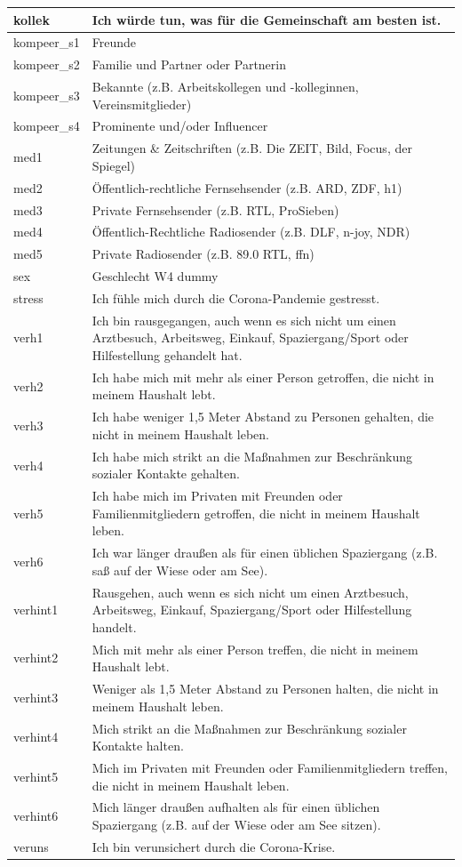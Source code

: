 \documentclass[
]{book}
\begin{document}
\begin{tabular}{l|l}
\hline
kollek & Ich würde tun, was für die Gemeinschaft am besten ist.\\
\hline
kompeer\_s1 & Freunde\\
\hline
kompeer\_s2 & Familie und Partner oder Partnerin\\
\hline
kompeer\_s3 & Bekannte (z.B. Arbeitskollegen und -kolleginnen, Vereinsmitglieder)\\
\hline
kompeer\_s4 & Prominente und/oder Influencer\\
\hline
med1 & Zeitungen \& Zeitschriften (z.B. Die ZEIT, Bild, Focus, der Spiegel)\\
\hline
med2 & Öffentlich-rechtliche Fernsehsender (z.B. ARD, ZDF, h1)\\
\hline
med3 & Private Fernsehsender (z.B. RTL, ProSieben)\\
\hline
med4 & Öffentlich-Rechtliche Radiosender (z.B. DLF, n-joy, NDR)\\
\hline
med5 & Private Radiosender (z.B. 89.0 RTL, ffn)\\
\hline
sex & Geschlecht W4 dummy\\
\hline
stress & Ich fühle mich durch die Corona-Pandemie gestresst.\\
\hline
verh1 & Ich bin rausgegangen, auch wenn es sich nicht um einen Arztbesuch, Arbeitsweg, Einkauf, Spaziergang/Sport oder Hilfestellung gehandelt hat.\\
\hline
verh2 & Ich habe mich mit mehr als einer Person getroffen, die nicht in meinem Haushalt lebt.\\
\hline
verh3 & Ich habe weniger 1,5 Meter Abstand zu Personen gehalten, die nicht in meinem Haushalt leben.\\
\hline
verh4 & Ich habe mich strikt an die Maßnahmen zur Beschränkung sozialer Kontakte gehalten.\\
\hline
verh5 & Ich habe mich im Privaten mit Freunden oder Familienmitgliedern getroffen, die nicht in meinem Haushalt leben.\\
\hline
verh6 & Ich war länger draußen als für einen üblichen Spaziergang (z.B. saß auf der Wiese oder am See).\\
\hline
verhint1 & Rausgehen, auch wenn es sich nicht um einen Arztbesuch, Arbeitsweg, Einkauf, Spaziergang/Sport oder Hilfestellung handelt.\\
\hline
verhint2 & Mich mit mehr als einer Person treffen, die nicht in meinem Haushalt lebt.\\
\hline
verhint3 & Weniger als 1,5 Meter Abstand zu Personen halten, die nicht in meinem Haushalt leben.\\
\hline
verhint4 & Mich strikt an die Maßnahmen zur Beschränkung sozialer Kontakte halten.\\
\hline
verhint5 & Mich im Privaten mit Freunden oder Familienmitgliedern treffen, die nicht in meinem Haushalt leben.\\
\hline
verhint6 & Mich länger draußen aufhalten als für einen üblichen Spaziergang (z.B. auf der Wiese oder am See sitzen).\\
\hline
veruns & Ich bin verunsichert durch die Corona-Krise.\\
\hline
\end{tabular}
\end{document}
